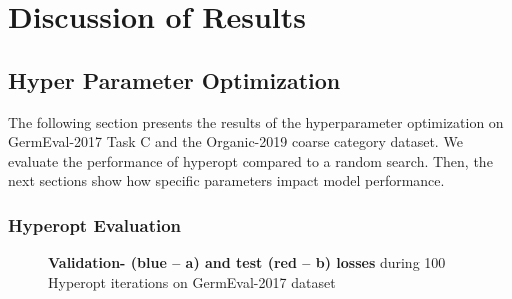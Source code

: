 \chapter{Discussion of Results}
\label{ch:discussion}

\section{Hyper Parameter Optimization}

The following section presents the results of the hyperparameter optimization on GermEval-2017 Task C and the Organic-2019 coarse category dataset. We evaluate the performance of hyperopt compared to a random search. Then, the next sections show how specific parameters impact model performance. 

\subsection{Hyperopt Evaluation}

\begin{figure}[ht]
	\centering
    \caption{\textbf{Validation- {(blue -- a)} and test {(red -- b)} losses} during 100 Hyperopt iterations on GermEval-2017 dataset}
    \label{fig:06_ValidationLossGermEvalHp}
\end{figure}

